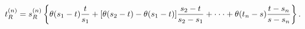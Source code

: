 \begin{equation}
t_R^{(n)}=s_R^{(n)}\left\{\theta(s_1-t) {t\over s_1}  +[\theta(s_2-t)-\theta(s_1-t)]
{s_2-t\over s_2-s_1}  +\cdot\cdot\cdot+\theta(t_n-s){t-s_n\over s-s_n}\right\}.
\end{equation} 
